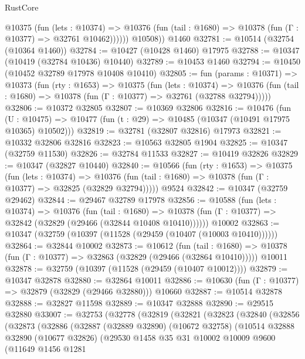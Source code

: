 \begin{lexlean}{RustCore}
\begin{coremodule}
            @10375
              (fun (lets : @10374) =>
              @10376 (fun (tail : @1680) => @10378 (fun (Γ : @10377) => @32761 @10462))))))
        @10508))
    @1460
@32781 := @10514 (@32754 (@10364 @1460))
@32784 := @10427 (@10428 @1460) @17975
@32788 := @10347 (@10419 (@32784 @10436) @10440)
@32789 := @10453 @1460
@32794 := @10450 (@10452 @32789 @17978 @10408 @10410)
@32805 := fun (params : @10371) =>
  @10373
    (fun (rty : @1653) =>
    @10375
      (fun (lets : @10374) =>
      @10376 (fun (tail : @1680) => @10378 (fun (Γ : @10377) => @32761 (@32788 @32794)))))
@32806 := @10372 @32805
@32807 := @10369 @32806
@32816 := @10476
    (fun (U : @10475) => @10477 (fun (t : @29) => @10485 (@10347 (@10491 @17975 @10365) @10502)))
@32819 := @32781 (@32807 @32816) @17973
@32821 := @10332 @32806 @32816
@32823 := @10563 @32805 @1904
@32825 := @10347 (@32759 @11530)
@32826 := @32784 @11533
@32827 := @10419 @32826
@32829 := @10347 (@32827 @10440)
@32840 := @10566
    (fun (rty : @1653) =>
    @10375
      (fun (lets : @10374) =>
      @10376 (fun (tail : @1680) => @10378 (fun (Γ : @10377) => @32825 (@32829 @32794)))))
    @9524
@32842 := @10347 (@32759 @29462)
@32844 := @29467 @32789 @17978
@32856 := @10588
    (fun (lets : @10374) =>
    @10376
      (fun (tail : @1680) =>
      @10378 (fun (Γ : @10377) => @32842 (@32829 (@29466 (@32844 @10408 @10410))))))
    @10002
@32863 := @10347 (@32759 (@10397 (@11528 (@29459 (@10407 (@10003 @10410))))))
@32864 := @32844 @10002
@32873 := @10612
    (fun (tail : @1680) => @10378 (fun (Γ : @10377) => @32863 (@32829 (@29466 (@32864 @10410)))))
    @10011
@32878 := @32759 (@10397 (@11528 (@29459 (@10407 @10012))))
@32879 := @10347 @32878
@32880 := @32864 @10011
@32886 := @10630 (fun (Γ : @10377) => @32879 (@32829 (@29466 @32880))) @10660
@32887 := @10514 @32878
@32888 := @32827 @11598
@32889 := @10347 @32888
@32890 := @29515 @32880
@33007 := @32753
    (@32778
      (@32819
        (@32821
          (@32823
            (@32840
              (@32856
                (@32873
                  (@32886
                    (@32887
                      (@32889 @32890)
                      (@10672 @32758)
                      (@10514
                        @32888
                        @32890
                        (@10677 @32826)
                        (@29530
                          @1458
                          @35
                          @31
                          @10002
                          @10009
                          @9600
                          (@11649
                            @1456
                            @1281

\end{coremodule}
\end{lexlean}
